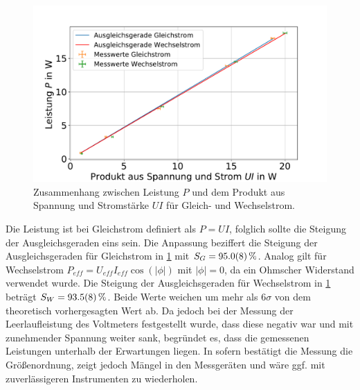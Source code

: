 



\begin{figure}
	\centering
	\includegraphics[width=0.9\linewidth]{"auswertung/Auswertung Innenwiderstand/Leistung 2"}
	\caption{Zusammenhang zwischen Leistung $P$ und dem Produkt aus Spannung und Stromstärke $UI$ für Gleich- und Wechselstrom.}
	\label{fig:leistung-r2}
\end{figure}




Die Leistung ist bei Gleichstrom definiert als $P=UI$, folglich sollte die Steigung der Ausgleichsgeraden eins sein. Die Anpassung beziffert die Steigung der Ausgleichsgeraden für Gleichstrom in \cref{fig:leistung-r2} mit $S_{G}=\SI{ 95.0+-0.8}{\percent}$. Analog gilt für Wechselstrom $P_{eff}=U_{eff}  I_{eff} \cos(|\phi|)$ mit $|\phi|=0$, da ein Ohmscher Widerstand verwendet wurde. Die Steigung der Ausgleichsgeraden für Wechselstrom in \cref{fig:leistung-r2} beträgt $S_W=\SI{93.5+-0.8}{\percent}$. Beide Werte weichen um mehr als $6\sigma$ von dem theoretisch vorhergesagten Wert ab. Da jedoch bei der Messung der Leerlaufleistung des Voltmeters festgestellt wurde, dass diese negativ war und mit zunehmender Spannung weiter sank, begründet es, dass die gemessenen Leistungen unterhalb der Erwartungen liegen. In sofern bestätigt die Messung die Größenordnung, zeigt jedoch Mängel in den Messgeräten und wäre ggf. mit zuverlässigeren Instrumenten zu wiederholen.














